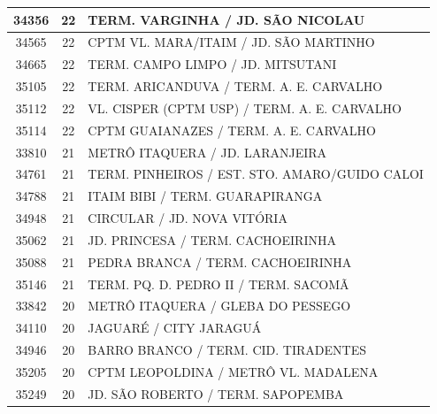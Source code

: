 \documentclass[
	12pt,				%
	oneside,			%
	a4paper,			%
	english,			%
	brazil				%
	]{abntex2ppgsi}
\begin{document}
{{\begin{apendicesenv}
\begin{longtable}{c|c|p{7cm}}
    34356 & 22    & TERM. VARGINHA / JD. SÃO NICOLAU \\
\hline

    34565 & 22    & CPTM VL. MARA/ITAIM / JD. SÃO MARTINHO \\
\hline

    34665 & 22    & TERM. CAMPO LIMPO / JD. MITSUTANI \\
\hline

    35105 & 22    & TERM. ARICANDUVA / TERM. A. E. CARVALHO \\
\hline

    35112 & 22    & VL. CISPER (CPTM USP) / TERM. A. E. CARVALHO \\
\hline

    35114 & 22    & CPTM GUAIANAZES / TERM. A. E. CARVALHO \\
\hline

    33810 & 21    & METRÔ ITAQUERA / JD. LARANJEIRA \\
\hline

    34761 & 21    & TERM. PINHEIROS / EST. STO. AMARO/GUIDO CALOI \\
\hline

    34788 & 21    & ITAIM BIBI / TERM. GUARAPIRANGA \\
\hline

    34948 & 21    & CIRCULAR / JD. NOVA VITÓRIA \\
\hline

    35062 & 21    & JD. PRINCESA / TERM. CACHOEIRINHA \\
\hline

    35088 & 21    & PEDRA BRANCA / TERM. CACHOEIRINHA \\
\hline

    35146 & 21    & TERM. PQ. D. PEDRO II / TERM. SACOMÃ \\
\hline

    33842 & 20    & METRÔ ITAQUERA / GLEBA DO PESSEGO \\
\hline

    34110 & 20    & JAGUARÉ / CITY JARAGUÁ \\
\hline

    34946 & 20    & BARRO BRANCO / TERM. CID. TIRADENTES \\
\hline

    35205 & 20    & CPTM LEOPOLDINA / METRÔ VL. MADALENA \\
\hline

    35249 & 20    & JD. SÃO ROBERTO / TERM. SAPOPEMBA \\
\hline


\end{longtable}
\end{apendicesenv}}}
\end{document}
